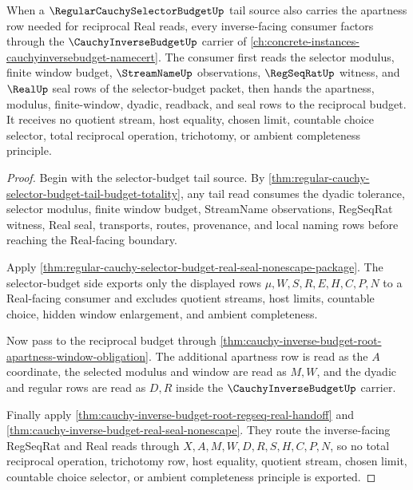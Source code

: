 \begin{theorem}
\label{thm:regular-cauchy-selector-budget-cauchy-inverse-apartness-handoff}
When a $\RegularCauchySelectorBudgetUp$ tail source also carries the apartness row needed for reciprocal Real reads, every inverse-facing consumer factors through the $\CauchyInverseBudgetUp$ carrier of \autoref{ch:concrete-instances-cauchyinversebudget-namecert}. The consumer first reads the selector modulus, finite window budget, $\StreamNameUp$ observations, $\RegSeqRatUp$ witness, and $\RealUp$ seal rows of the selector-budget packet, then hands the apartness, modulus, finite-window, dyadic, readback, and seal rows to the reciprocal budget. It receives no quotient stream, host equality, chosen limit, countable choice selector, total reciprocal operation, trichotomy, or ambient completeness principle.
\end{theorem}
\begin{proof}
Begin with the selector-budget tail source. By \autoref{thm:regular-cauchy-selector-budget-tail-budget-totality}, any tail read consumes the dyadic tolerance, selector modulus, finite window budget, StreamName observations, RegSeqRat witness, Real seal, transports, routes, provenance, and local naming rows before reaching the Real-facing boundary.

Apply \autoref{thm:regular-cauchy-selector-budget-real-seal-nonescape-package}. The selector-budget side exports only the displayed rows $\mu,W,S,R,E,H,C,P,N$ to a Real-facing consumer and excludes quotient streams, host limits, countable choice, hidden window enlargement, and ambient completeness.

Now pass to the reciprocal budget through \autoref{thm:cauchy-inverse-budget-root-apartness-window-obligation}. The additional apartness row is read as the $A$ coordinate, the selected modulus and window are read as $M,W$, and the dyadic and regular rows are read as $D,R$ inside the $\CauchyInverseBudgetUp$ carrier.

Finally apply \autoref{thm:cauchy-inverse-budget-root-regseq-real-handoff} and \autoref{thm:cauchy-inverse-budget-real-seal-nonescape}. They route the inverse-facing RegSeqRat and Real reads through $X,A,M,W,D,R,S,H,C,P,N$, so no total reciprocal operation, trichotomy row, host equality, quotient stream, chosen limit, countable choice selector, or ambient completeness principle is exported.
\end{proof}

